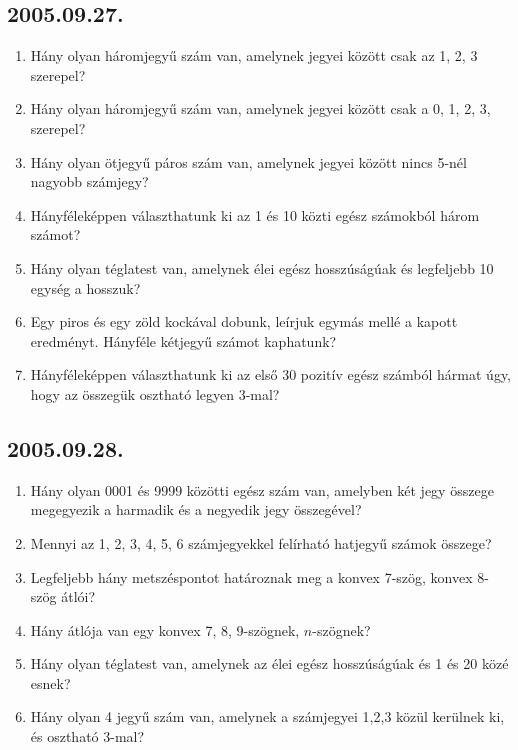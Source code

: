 \subsection*{2005.09.27.}
\begin{enumerate}
\item Hány olyan háromjegyű szám van, amelynek jegyei között csak az 1, 2, 3 szerepel?

\item Hány olyan háromjegyű szám van, amelynek jegyei között csak a 0, 1, 2, 3, szerepel?

\item Hány olyan ötjegyű páros szám van, amelynek jegyei között nincs 5-nél nagyobb számjegy?

\item Hányféleképpen választhatunk ki az 1 és 10 közti egész számokból három számot?

\item Hány olyan téglatest van, amelynek élei egész hosszúságúak és legfeljebb 10 egység a hosszuk?

\item Egy piros és egy zöld kockával dobunk, leírjuk egymás mellé a kapott eredményt. Hányféle kétjegyű számot kaphatunk?

\item Hányféleképpen választhatunk ki az első 30 pozitív egész számból hármat úgy, hogy az összegük osztható legyen 3-mal?
\end{enumerate}


\subsection*{2005.09.28.}
\begin{enumerate}
\item Hány olyan 0001 és 9999 közötti egész szám van, amelyben két jegy összege megegyezik a harmadik és a negyedik jegy összegével?

\item Mennyi az 1, 2, 3, 4, 5, 6 számjegyekkel felírható hatjegyű számok összege?

\item Legfeljebb hány metszéspontot határoznak meg a konvex 7-szög, konvex 8-szög átlói?

\item Hány átlója van egy konvex 7, 8, 9-szögnek, 
$n$-szögnek?

\item Hány olyan téglatest van, amelynek az élei egész hosszúságúak és 1 és 20 közé esnek?

\item Hány olyan 4 jegyű szám van, amelynek a számjegyei 1,2,3 közül kerülnek ki, és osztható 
3-mal?
\end{enumerate}


